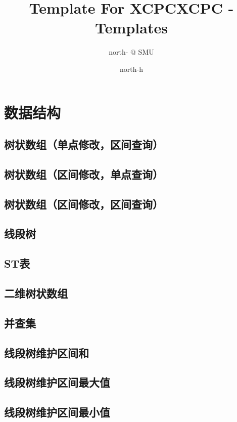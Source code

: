 \documentclass[10pt,a4paper]{article}
\title{Template For XCPC}
\author{north- @ SMU}
\begin{document}
\title{XCPC - Templates}
\author {north-h}
\date{}
\maketitle
\tableofcontents
\newpage
\section{数据结构}
\subsection{树状数组（单点修改，区间查询）}

\subsection{树状数组（区间修改，单点查询）}

\subsection{树状数组（区间修改，区间查询）}

\subsection{线段树}

\subsection{ST表}

\subsection{二维树状数组}

\subsection{并查集}

\subsection{线段树维护区间和}

\subsection{线段树维护区间最大值}

\subsection{线段树维护区间最小值}

\end{document}
